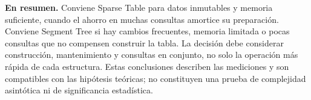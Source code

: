 \textbf{En resumen.} Conviene Sparse Table para datos inmutables y
memoria suficiente, cuando el ahorro en muchas consultas amortice su preparación.
Conviene Segment Tree si hay cambios frecuentes, memoria limitada o pocas
consultas que no compensen construir la tabla. La decisión debe considerar
construcción, mantenimiento y consultas en conjunto, no solo la operación
más rápida de cada estructura. Estas conclusiones describen las mediciones
y son compatibles con las hipótesis teóricas; no constituyen una prueba
de complejidad asintótica ni de significancia estadística.

